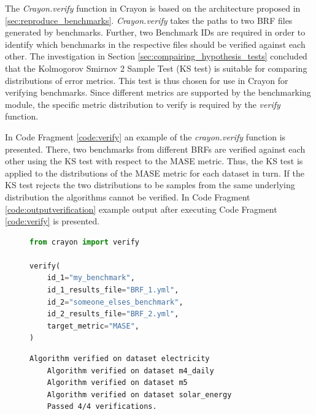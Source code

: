 The \textit{Crayon.verify} function in Crayon is based on the architecture proposed in \ref{sec:reproduce_benchmarks}. \textit{Crayon.verify} takes the paths to two BRF files generated by benchmarks. Further, two Benchmark IDs are required in order to identify which benchmarks in the respective files should be verified against each other. The investigation in Section \ref{sec:compairing_hypothesis_tests} concluded that the Kolmogorov Smirnov 2 Sample Test (KS test) is suitable for comparing distributions of error metrics. This test is thus chosen for use in Crayon for verifying benchmarks. Since different metrics are supported by the benchmarking module, the specific metric distribution to verify is required by the \textit{verify} function.

In Code Fragment \ref{code:verify} an example of the \textit{crayon.verify} function is presented. There, two benchmarks from different BRFs are verified against each other using the KS test with respect to the MASE metric. Thus, the KS test is applied to the distributions of the MASE metric for each dataset in turn. If the KS test rejects the two distributions to be samples from the same underlying distribution the algorithms cannot be verified. In Code Fragment \ref{code:outputverification} example output after executing Code Fragment \ref{code:verify} is presented.

\begin{figure}
  \begin{lstlisting}[language=Python, label={code:verify}, caption={Verifying whether two benchmarks are performed by the same algorithm.}]
from crayon import verify

verify(
    id_1="my_benchmark",
    id_1_results_file="BRF_1.yml", 
    id_2="someone_elses_benchmark",
    id_2_results_file="BRF_2.yml",
    target_metric="MASE",
)
\end{lstlisting}
\end{figure}
\begin{figure}
  \begin{lstlisting}[language=bash, label={code:outputverification}, caption={Output from Code Fragment \ref{code:verify}}]
    Algorithm verified on dataset electricity
    Algorithm verified on dataset m4_daily
    Algorithm verified on dataset m5
    Algorithm verified on dataset solar_energy
    Passed 4/4 verifications.
\end{lstlisting}
\end{figure}
